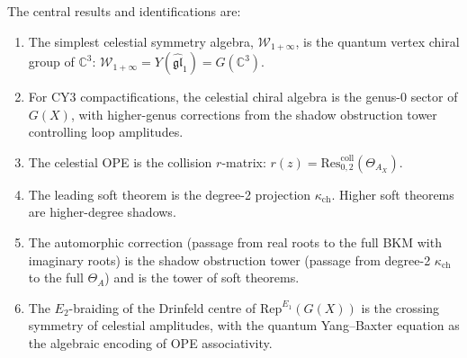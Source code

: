 \documentclass[11pt]{article}
\theoremstyle{definition}
\theoremstyle{remark}
\newcommand{\cW}{\mathcal{W}}
\newcommand{\Rep}{\mathrm{Rep}}
\newcommand{\Res}{\mathrm{Res}}
\begin{document}
The central results and identifications are:

\begin{enumerate}[label=(\alph*)]
\item The simplest celestial symmetry algebra, $\cW_{1+\infty}$,
 is the quantum vertex chiral group of $\mathbb{C}^3$:
 $\cW_{1+\infty} = Y(\widehat{\mathfrak{gl}}_1) = G(\mathbb{C}^3)$.

\item For CY3 compactifications, the celestial chiral algebra is
 the genus-0 sector of $G(X)$, with higher-genus corrections
 from the shadow obstruction tower controlling loop amplitudes.

\item The celestial OPE is the collision $r$-matrix:
 $r(z) = \Res^{\mathrm{coll}}_{0,2}(\Theta_{A_X})$.

\item The leading soft theorem is the degree-2 projection $\kappa_{\mathrm{ch}}$.
 Higher soft theorems are higher-degree shadows.

\item The automorphic correction (passage from real roots to the
 full BKM with imaginary roots) is the shadow obstruction tower
 (passage from degree-2 $\kappa_{\mathrm{ch}}$ to the full $\Theta_A$)
 and is the tower of soft theorems.

\item The $E_2$-braiding of the Drinfeld centre of $\Rep^{E_1}(G(X))$
 is the crossing symmetry of celestial amplitudes, with the quantum
 Yang--Baxter equation as the algebraic encoding of OPE associativity.
\end{enumerate}
\end{document}
